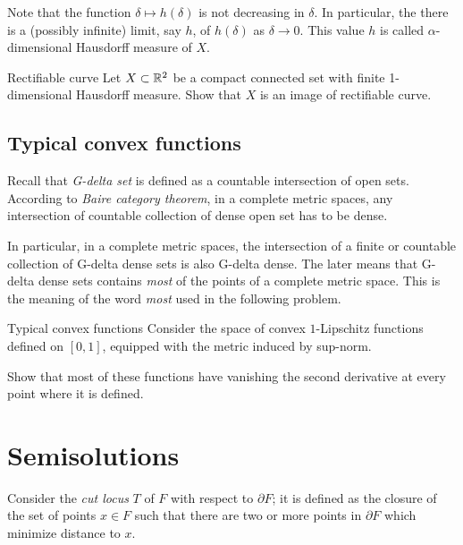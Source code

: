 Note that the function $\delta\mapsto h(\delta)$ is not decreasing in $\delta$.
In particular, the there is a (possibly infinite) limit, say $h$, of $h(\delta)$ as $\delta\to0$.
This value $h$ is called $\alpha$-dimensional Hausdorff measure of $X$.

\begin{pr}{}{Rectifiable curve}\label{Rectifiable curve}
Let $X\subset \mathbb{R}^2$ be a compact connected set
with finite 1-dimensional Hausdorff measure. 
Show that $X$ is an image of rectifiable curve.
\end{pr}

\subsection*{Typical convex functions}

Recall that \emph{G-delta set} is defined as a countable intersection of open sets.
According to \emph{Baire category theorem}, 
in a complete metric spaces,
any intersection of countable collection of dense open set 
has to be dense.

In particular, in a complete metric spaces, 
the intersection of a finite or countable collection of G-delta dense sets is also G-delta dense. 
The later means that G-delta dense sets contains {}\emph{most} of the points of a complete metric space. 
This is the meaning of the word {}\emph{most} used in the following problem.

\begin{pr}{\easy}{Typical convex functions}\label{Most of the convex functions}
Consider the space of convex $1$-Lipschitz functions defined on $[0,1]$,
equipped with the metric induced by sup-norm.

Show that most of these functions have vanishing the second derivative at every point where it is defined.
\end{pr}


\section*{Semisolutions}


Consider the {\it cut locus} $T$
of $F$ with respect to $\partial F$;
it is defined as the closure
of the set of points $x\in F$ 
such that there are two or more points in $\partial F$ which minimize distance to $x$.

